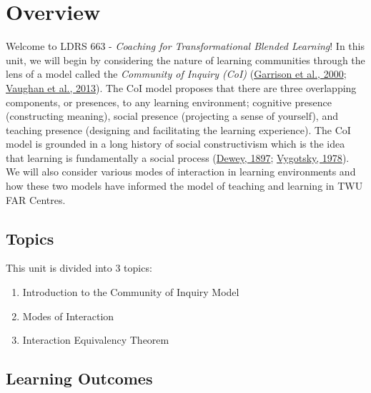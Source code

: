 \documentclass[
]{book}
\providecommand{\tightlist}{%
  \setlength{\itemsep}{0pt}\setlength{\parskip}{0pt}}
\begin{document}
\hypertarget{overview}{%
\section*{Overview}\label{overview}}

Welcome to LDRS 663 - \emph{Coaching for Transformational Blended Learning}! In this unit, we will begin by considering the nature of learning communities through the lens of a model called the \emph{Community of Inquiry (CoI)} (\href{https://www.sciencedirect.com/science/article/pii/S1096751600000166?}{Garrison et al., 2000}; \href{http://www.aupress.ca/index.php/books/120229}{Vaughan et al., 2013}). The CoI model proposes that there are three overlapping components, or presences, to any learning environment; cognitive presence (constructing meaning), social presence (projecting a sense of yourself), and teaching presence (designing and facilitating the learning experience). The CoI model is grounded in a long history of social constructivism which is the idea that learning is fundamentally a social process (\href{https://en.wikisource.org/wiki/My_Pedagogic_Creed}{Dewey, 1897}; \href{https://twu.idm.oclc.org/login?url=http://search.ebscohost.com/login.aspx?direct=true\&db=cat05965a\&AN=alc.191437\&site=eds-live}{Vygotsky, 1978}). We will also consider various modes of interaction in learning environments and how these two models have informed the model of teaching and learning in TWU FAR Centres.

\hypertarget{topics}{%
\subsection*{Topics}\label{topics}}

This unit is divided into 3 topics:

\begin{enumerate}
\def\labelenumi{\arabic{enumi}.}
\tightlist
\item
  Introduction to the Community of Inquiry Model\\
\item
  Modes of Interaction\\
\item
  Interaction Equivalency Theorem
\end{enumerate}

\hypertarget{learning-outcomes}{%
\subsection*{Learning Outcomes}\label{learning-outcomes}}
\end{document}
